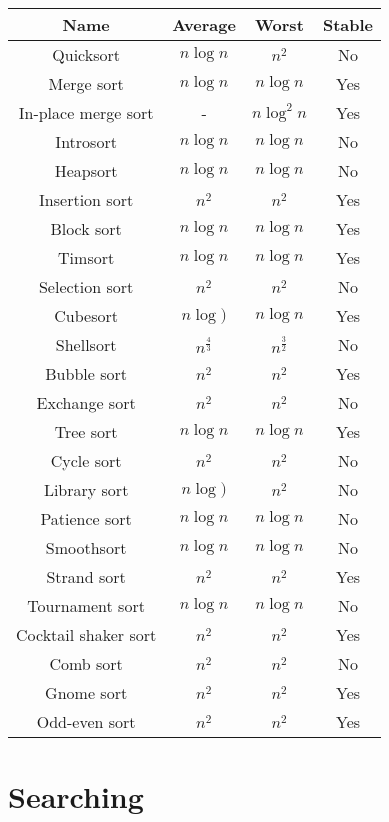 \documentclass{article}
\begin{document}
\begin{table}[ht]
	\centering
	\scriptsize
	\begin{tabular}{cccc}
		Name & Average & Worst & Stable\\
		\hline
		Quicksort & $n\log{n}$ & $n^2$ & No\\
		Merge sort & $n\log{n}$ & $n\log{n}$ & Yes\\
		In-place merge sort & - & $n\log^2{n}$ & Yes\\
		Introsort & $n\log{n}$ & $n\log{n}$ & No\\
		Heapsort & $n\log{n}$ & $n\log{n}$ & No\\
		Insertion sort & $n^2$ & $n^2$ & Yes\\
		Block sort & $n\log{n}$ & $n\log{n}$ & Yes\\
		Timsort & $n\log{n}$ & $n\log{n}$ & Yes\\
		Selection sort & $n^2$ & $n^2$ & No\\
		Cubesort & $n\log{)}$ & $n\log{n}$ & Yes\\
		Shellsort & $n^{\frac{4}{3}}$ & $n^{\frac{3}{2}}$ & No\\
		Bubble sort & $n^2$ & $n^2$ & Yes\\
		Exchange sort & $n^2$ & $n^2$ & No\\
		Tree sort & $n\log{n}$ & $n\log{n}$ & Yes\\
		Cycle sort & $n^2$ & $n^2$ & No\\
		Library sort & $n\log{)}$ & $n^2$ & No\\
		Patience sort & $n\log{n}$ & $n\log{n}$ & No\\
		Smoothsort & $n\log{n}$ & $n\log{n}$ & No\\
		Strand sort & $n^2$ & $n^2$ & Yes\\
		Tournament sort & $n\log{n}$ & $n\log{n}$ & No\\
		Cocktail shaker sort & $n^2$ & $n^2$ & Yes\\
		Comb sort & $n^2$ & $n^2$ & No\\
		Gnome sort & $n^2$ & $n^2$ & Yes\\
		Odd-even sort & $n^2$ & $n^2$ & Yes\\
		\hline
	\end{tabular}
\end{table}


\newpage
\section*{Searching}
\end{document}
